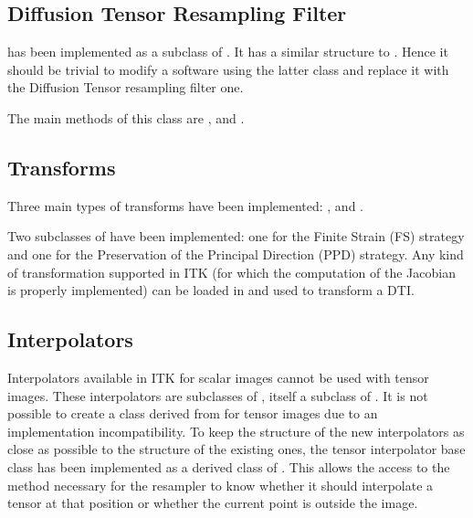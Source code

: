 \documentclass{InsightArticle}
\begin{document}
\subsection{Diffusion Tensor Resampling Filter}
 has been implemented as a subclass of . It has a similar structure to . Hence it should be trivial to modify a software using the latter class and replace it with the Diffusion Tensor resampling filter one.

The main methods of this class are ,  and .

\subsection{Transforms}
Three main types of transforms have been implemented: ,  and .

Two subclasses of  have been implemented: one for the Finite Strain (FS) strategy and one for the Preservation of the Principal Direction (PPD) strategy. Any kind of transformation supported in ITK (for which the computation of the Jacobian is properly implemented) can be loaded in  and used to transform a DTI.

\subsection{Interpolators}

Interpolators available in ITK for scalar images cannot be used with tensor images. These interpolators are subclasses of , itself a subclass of . It is not possible to create a class derived from  for tensor images due to an implementation incompatibility. To keep the structure of the new interpolators as close as possible to the structure of the existing ones, the tensor interpolator base class has been implemented as a derived class of . This allows the access to the method  necessary for the resampler to know whether it should  interpolate a tensor at that position or whether the current point is outside the image.
\end{document}
